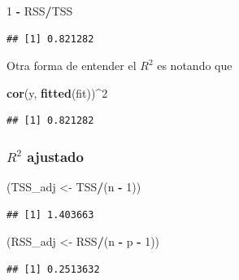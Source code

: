 \documentclass[
  12pt,
]{book}
\newenvironment{Shaded}{\begin{snugshade}}{\end{snugshade}}
\newcommand{\DecValTok}[1]{\textcolor[rgb]{0.00,0.00,0.81}{#1}}
\newcommand{\KeywordTok}[1]{\textcolor[rgb]{0.13,0.29,0.53}{\textbf{#1}}}
\newcommand{\NormalTok}[1]{#1}
\newcommand{\OperatorTok}[1]{\textcolor[rgb]{0.81,0.36,0.00}{\textbf{#1}}}
\newcommand{\StringTok}[1]{\textcolor[rgb]{0.31,0.60,0.02}{#1}}
\theoremstyle{definition}
\theoremstyle{definition}
\theoremstyle{definition}
\theoremstyle{remark}
\begin{document}
\begin{Shaded}
\begin{Highlighting}[]
\DecValTok{1} \OperatorTok{-}\StringTok{ }\NormalTok{RSS}\OperatorTok{/}\NormalTok{TSS}
\end{Highlighting}
\end{Shaded}

\begin{verbatim}
## [1] 0.821282
\end{verbatim}

Otra forma de entender el \(R^2\) es notando que

\begin{Shaded}
\begin{Highlighting}[]
\KeywordTok{cor}\NormalTok{(y, }\KeywordTok{fitted}\NormalTok{(fit))}\OperatorTok{^}\DecValTok{2}
\end{Highlighting}
\end{Shaded}

\begin{verbatim}
## [1] 0.821282
\end{verbatim}

\hypertarget{r2-ajustado}{%
\subsubsection{\texorpdfstring{\(R^2\) ajustado}{R\^{}2 ajustado}}\label{r2-ajustado}}

\begin{Shaded}
\begin{Highlighting}[]
\NormalTok{(TSS_adj <-}\StringTok{ }\NormalTok{TSS}\OperatorTok{/}\NormalTok{(n }\OperatorTok{-}\StringTok{ }\DecValTok{1}\NormalTok{))}
\end{Highlighting}
\end{Shaded}

\begin{verbatim}
## [1] 1.403663
\end{verbatim}

\begin{Shaded}
\begin{Highlighting}[]
\NormalTok{(RSS_adj <-}\StringTok{ }\NormalTok{RSS}\OperatorTok{/}\NormalTok{(n }\OperatorTok{-}\StringTok{ }\NormalTok{p }\OperatorTok{-}\StringTok{ }\DecValTok{1}\NormalTok{))}
\end{Highlighting}
\end{Shaded}

\begin{verbatim}
## [1] 0.2513632
\end{verbatim}
\end{document}

